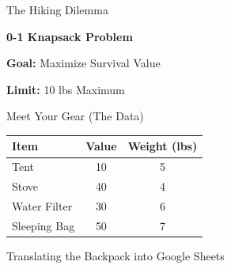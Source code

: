 \documentclass{beamer}
\begin{document}
\begin{frame}{The Hiking Dilemma}
  \begin{center}
    \Huge \textbf{0-1 Knapsack Problem}
    
    \vspace{1cm}
    \Large
    \textbf{Goal:} Maximize Survival Value
    
    \vspace{0.5cm}
    \textbf{Limit:} 10 lbs Maximum
  \end{center}
\end{frame}

\begin{frame}{Meet Your Gear (The Data)}
  \begin{center}
    \Large
    \renewcommand{\arraystretch}{1.5}
    \begin{tabular}{|l|c|c|}
      \hline
      \textbf{Item} & \textbf{Value} & \textbf{Weight (lbs)} \\
      \hline
      Tent & 10 & 5 \\
      \hline
      Stove & 40 & 4 \\
      \hline
      Water Filter & 30 & 6 \\
      \hline
      Sleeping Bag & 50 & 7 \\
      \hline
    \end{tabular}
  \end{center}
\end{frame}

\begin{frame}{Translating the Backpack into Google Sheets}
  \begin{center}
    \renewcommand{\arraystretch}{1.2}
  \end{center}
\end{frame}
\end{document}
